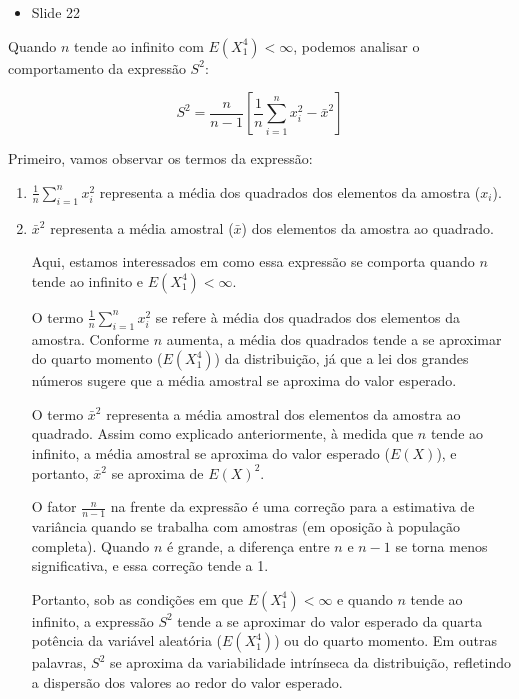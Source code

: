 \documentclass[12pt]{report}
\begin{document}
\begin{itemize}
    \item Slide 22
\end{itemize}

Quando $n$ tende ao infinito com $E(X_{1}^{4}) < \infty$, podemos analisar o comportamento da expressão $S^{2}$:

$$S^{2} = \frac{n}{n-1} \left[ \frac{1}{n} \sum_{i=1}^{n} x_{i}^{2} - \bar{x}^{2} \right]$$

Primeiro, vamos observar os termos da expressão:
\begin{enumerate}

\item $\frac{1}{n} \sum_{i=1}^{n} x_{i}^{2}$ representa a média dos quadrados dos elementos da amostra ($x_{i}$).

\item $\bar{x}^{2}$ representa a média amostral ($\bar{x}$) dos elementos da amostra ao quadrado.

Aqui, estamos interessados em como essa expressão se comporta quando $n$ tende ao infinito e $E(X_{1}^{4}) < \infty$.

O termo $\frac{1}{n} \sum_{i=1}^{n} x_{i}^{2}$ se refere à média dos quadrados dos elementos da amostra. Conforme $n$ aumenta, a média dos quadrados tende a se aproximar do quarto momento ($E(X_{1}^{4})$) da distribuição, já que a lei dos grandes números sugere que a média amostral se aproxima do valor esperado.

O termo $\bar{x}^{2}$ representa a média amostral dos elementos da amostra ao quadrado. Assim como explicado anteriormente, à medida que $n$ tende ao infinito, a média amostral se aproxima do valor esperado ($E(X)$), e portanto, $\bar{x}^{2}$ se aproxima de $E(X)^{2}$.

O fator $\frac{n}{n-1}$ na frente da expressão é uma correção para a estimativa de variância quando se trabalha com amostras (em oposição à população completa). Quando $n$ é grande, a diferença entre $n$ e $n-1$ se torna menos significativa, e essa correção tende a 1.

Portanto, sob as condições em que $E(X_{1}^{4}) < \infty$ e quando $n$ tende ao infinito, a expressão $S^{2}$ tende a se aproximar do valor esperado da quarta potência da variável aleatória ($E(X_{1}^{4})$) ou do quarto momento. Em outras palavras, $S^{2}$ se aproxima da variabilidade intrínseca da distribuição, refletindo a dispersão dos valores ao redor do valor esperado.
\end{enumerate}
\end{document}
